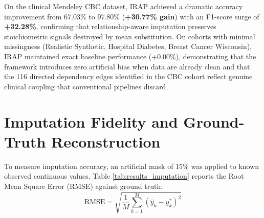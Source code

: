 \documentclass[MTech]{ugthesis}
\begin{document}
\begin{table}[htpb]
\small
\centering
\renewcommand{\arraystretch}{1.3}
\caption{Downstream classification accuracy and F1-score comparison (Baseline vs. IRAP).}
\label{tab:results_classification}
\end{table}

On the clinical Mendeley CBC dataset, IRAP achieved a dramatic accuracy improvement from 67.03\% to 97.80\% (\textbf{+30.77\% gain}) with an F1-score surge of \textbf{+32.28\%}, confirming that relationship-aware imputation preserves stoichiometric signals destroyed by mean substitution. On cohorts with minimal missingness (Realistic Synthetic, Hospital Diabetes, Breast Cancer Wisconsin), IRAP maintained exact baseline performance (+0.00\%), demonstrating that the framework introduces zero artificial bias when data are already clean and that the 116 directed dependency edges identified in the CBC cohort reflect genuine clinical coupling that conventional pipelines discard.

\section{Imputation Fidelity and Ground-Truth Reconstruction}
To measure imputation accuracy, an artificial mask of 15\% was applied to known observed continuous values. Table \ref{tab:results_imputation} reports the Root Mean Square Error (\ac{RMSE}) against ground truth:
\begin{equation}
    \text{RMSE} = \sqrt{\frac{1}{M} \sum_{k=1}^M (\hat{y}_k - y_k^*)^2}
\end{equation}
\end{document}
